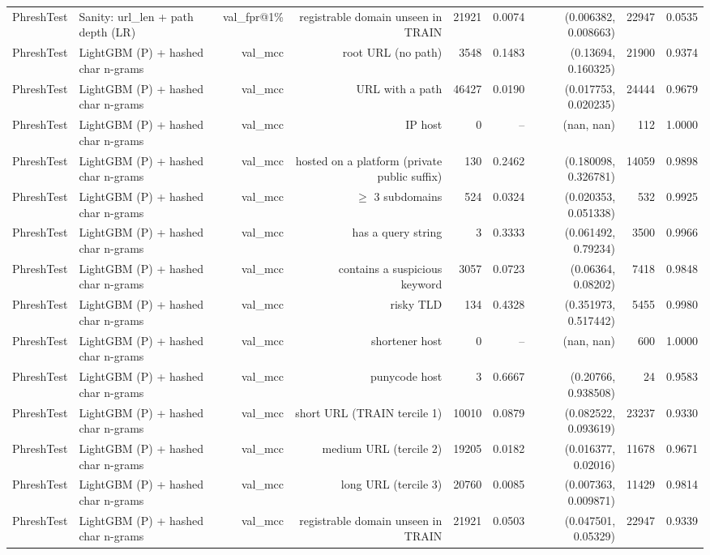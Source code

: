 \begin{table}[t]
\begin{tabular}{llrrrrrrr}
PhreshTest & Sanity: url\_len + path depth (LR) & val\_fpr@1\% & registrable domain unseen in TRAIN & 21921 & 0.0074 & (0.006382, 0.008663) & 22947 & 0.0535 \\
PhreshTest & LightGBM (P) + hashed char n-grams & val\_mcc & root URL (no path) & 3548 & 0.1483 & (0.13694, 0.160325) & 21900 & 0.9374 \\
PhreshTest & LightGBM (P) + hashed char n-grams & val\_mcc & URL with a path & 46427 & 0.0190 & (0.017753, 0.020235) & 24444 & 0.9679 \\
PhreshTest & LightGBM (P) + hashed char n-grams & val\_mcc & IP host & 0 & -- & (nan, nan) & 112 & 1.0000 \\
PhreshTest & LightGBM (P) + hashed char n-grams & val\_mcc & hosted on a platform (private public suffix) & 130 & 0.2462 & (0.180098, 0.326781) & 14059 & 0.9898 \\
PhreshTest & LightGBM (P) + hashed char n-grams & val\_mcc & $\geq$ 3 subdomains & 524 & 0.0324 & (0.020353, 0.051338) & 532 & 0.9925 \\
PhreshTest & LightGBM (P) + hashed char n-grams & val\_mcc & has a query string & 3 & 0.3333 & (0.061492, 0.79234) & 3500 & 0.9966 \\
PhreshTest & LightGBM (P) + hashed char n-grams & val\_mcc & contains a suspicious keyword & 3057 & 0.0723 & (0.06364, 0.08202) & 7418 & 0.9848 \\
PhreshTest & LightGBM (P) + hashed char n-grams & val\_mcc & risky TLD & 134 & 0.4328 & (0.351973, 0.517442) & 5455 & 0.9980 \\
PhreshTest & LightGBM (P) + hashed char n-grams & val\_mcc & shortener host & 0 & -- & (nan, nan) & 600 & 1.0000 \\
PhreshTest & LightGBM (P) + hashed char n-grams & val\_mcc & punycode host & 3 & 0.6667 & (0.20766, 0.938508) & 24 & 0.9583 \\
PhreshTest & LightGBM (P) + hashed char n-grams & val\_mcc & short URL (TRAIN tercile 1) & 10010 & 0.0879 & (0.082522, 0.093619) & 23237 & 0.9330 \\
PhreshTest & LightGBM (P) + hashed char n-grams & val\_mcc & medium URL (tercile 2) & 19205 & 0.0182 & (0.016377, 0.02016) & 11678 & 0.9671 \\
PhreshTest & LightGBM (P) + hashed char n-grams & val\_mcc & long URL (tercile 3) & 20760 & 0.0085 & (0.007363, 0.009871) & 11429 & 0.9814 \\
PhreshTest & LightGBM (P) + hashed char n-grams & val\_mcc & registrable domain unseen in TRAIN & 21921 & 0.0503 & (0.047501, 0.05329) & 22947 & 0.9339 \\

\end{tabular}
\end{table}
